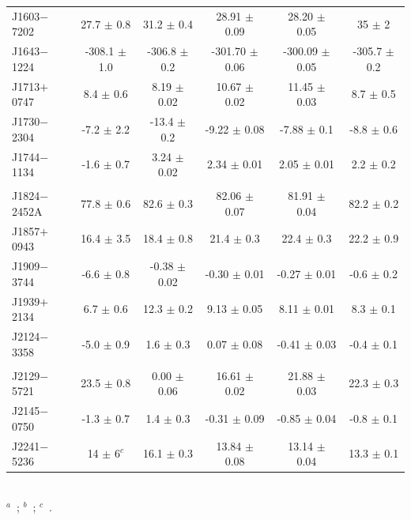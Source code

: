 \documentclass[useAMS,usenatbib]{mn2e}
\begin{document}
\begin{table}
\begin{tabular}{lccccc}
J1603$-$7202 & 27.7   $\pm$ 0.8      & 31.2   $\pm$ 0.4   & 28.91   $\pm$ 0.09  &  28.20   $\pm$ 0.05  &  35     $\pm$ 2    \\  
J1643$-$1224 & -308.1 $\pm$ 1.0      & -306.8 $\pm$ 0.2   & -301.70 $\pm$ 0.06  &  -300.09 $\pm$ 0.05  &  -305.7 $\pm$ 0.2    \\   
J1713$+$0747 & 8.4    $\pm$ 0.6      & 8.19   $\pm$ 0.02  & 10.67   $\pm$ 0.02  &  11.45   $\pm$ 0.03  &  8.7    $\pm$ 0.5    \\  
J1730$-$2304 & -7.2   $\pm$ 2.2      & -13.4  $\pm$ 0.2   & -9.22   $\pm$ 0.08  &  -7.88   $\pm$ 0.1   &  -8.8   $\pm$ 0.6    \\  
J1744$-$1134 & -1.6   $\pm$ 0.7      & 3.24   $\pm$ 0.02  & 2.34    $\pm$ 0.01  &  2.05    $\pm$ 0.01  &  2.2    $\pm$ 0.2    \\  
             &                       &                    &                     &                      &                      \\
J1824$-$2452A& 77.8   $\pm$ 0.6      & 82.6   $\pm$ 0.3   & 82.06   $\pm$ 0.07  &  81.91   $\pm$ 0.04  &  82.2   $\pm$ 0.2    \\  
J1857$+$0943 & 16.4   $\pm$ 3.5      & 18.4   $\pm$ 0.8   & 21.4    $\pm$ 0.3   &  22.4    $\pm$ 0.3   &  22.2   $\pm$ 0.9    \\  
J1909$-$3744 & -6.6   $\pm$ 0.8      & -0.38  $\pm$ 0.02  & -0.30   $\pm$ 0.01  &  -0.27   $\pm$ 0.01  &  -0.6   $\pm$ 0.2    \\  
J1939$+$2134 & 6.7    $\pm$ 0.6      & 12.3   $\pm$ 0.2   & 9.13    $\pm$ 0.05  &  8.11    $\pm$ 0.01  &  8.3    $\pm$ 0.1    \\  
J2124$-$3358 & -5.0   $\pm$ 0.9      & 1.6    $\pm$ 0.3   & 0.07    $\pm$ 0.08  &  -0.41   $\pm$ 0.03  &  -0.4   $\pm$ 0.1    \\  
             &                       &                    &                     &                      &                      \\
J2129$-$5721 & 23.5   $\pm$ 0.8      & 0.00   $\pm$ 0.06  & 16.61   $\pm$ 0.02  &  21.88   $\pm$ 0.03  &  22.3   $\pm$ 0.3     \\  
J2145$-$0750 & -1.3   $\pm$ 0.7      & 1.4    $\pm$ 0.3   & -0.31   $\pm$ 0.09  &  -0.85   $\pm$ 0.04  &  -0.8   $\pm$ 0.1     \\  
J2241$-$5236 & 14     $\pm$ $6^c$    & 16.1   $\pm$ 0.3   & 13.84   $\pm$ 0.08  &  13.14   $\pm$ 0.04  &  13.3   $\pm$ 0.1    \\
\hline
\end{tabular}
~\\
$^a$~\citet{Keith12}; $^b$~\citet{Burgay13}; $^c$~\citet{Keith11}.
\end{table}
 
\end{document}
